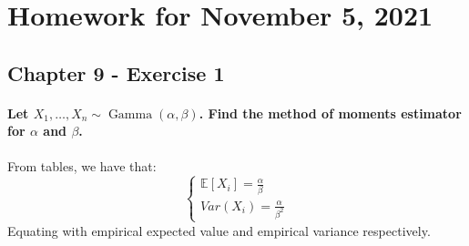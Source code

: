 \documentclass{article}
\newcommand{\E}{\mathbb{E}}
\begin{document}
\section{Homework for November 5, 2021}
\subsection{Chapter 9 - Exercise 1}
\paragraph{Let $X_{1}, \ldots, X_{n} \sim \operatorname{Gamma}(\alpha, \beta)$. Find the method of moments estimator for $\alpha$ and $\beta$.}
From tables, we have that:
\begin{equation*}
    \begin{cases}
        \E [X_i] = \frac{\alpha}{\beta} \\
        Var (X_i) = \frac{\alpha}{\beta^2}
    \end{cases}
\end{equation*}
Equating with empirical expected value and empirical variance respectively.
\end{document}
